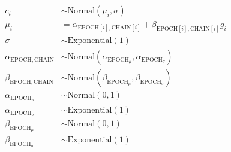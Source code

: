 \documentclass[doc,biblatex]{apa7}
\begin{document}
\clearpage

\section{}

\begin{equation}
\begin{aligned}
   c_i                                 & \sim \mathrm{Normal}(\mu_i, \sigma) \\
 \mu_i                                 & = \alpha_{\mathrm{EPOCH}[i],\mathrm{CHAIN}[i]} + \beta_{\mathrm{EPOCH}[i],\mathrm{CHAIN}[i]} g_i \\
\sigma                                 & \sim \mathrm{Exponential}(1) \\
\alpha_{\mathrm{EPOCH},\mathrm{CHAIN}} & \sim \mathrm{Normal}(\alpha_{\mathrm{EPOCH}_\mu}, \alpha_{\mathrm{EPOCH}_\sigma}) \\
\beta_{\mathrm{EPOCH},\mathrm{CHAIN}}  & \sim \mathrm{Normal}(\beta_{\mathrm{EPOCH}_\mu}, \beta_{\mathrm{EPOCH}_\sigma}) \\
\alpha_{\mathrm{EPOCH}_\mu}            & \sim \mathrm{Normal}(0, 1) \\
\alpha_{\mathrm{EPOCH}_\sigma}         & \sim \mathrm{Exponential}(1) \\
\beta_{\mathrm{EPOCH}_\mu}             & \sim \mathrm{Normal}(0, 1) \\
\beta_{\mathrm{EPOCH}_\sigma}          & \sim \mathrm{Exponential}(1)
\end{aligned}
\end{equation}
\end{document}
